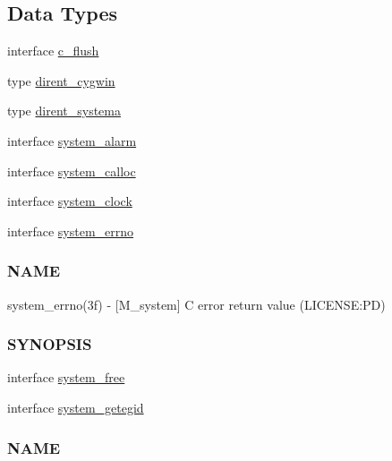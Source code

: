 \subsection*{Data Types}
\begin{DoxyCompactItemize}
\item 
interface \mbox{\hyperlink{interfacem__system_1_1c__flush}{c\+\_\+flush}}
\item 
type \mbox{\hyperlink{structm__system_1_1dirent__cygwin}{dirent\+\_\+cygwin}}
\item 
type \mbox{\hyperlink{structm__system_1_1dirent__systema}{dirent\+\_\+systema}}
\item 
interface \mbox{\hyperlink{interfacem__system_1_1system__alarm}{system\+\_\+alarm}}
\item 
interface \mbox{\hyperlink{interfacem__system_1_1system__calloc}{system\+\_\+calloc}}
\item 
interface \mbox{\hyperlink{interfacem__system_1_1system__clock}{system\+\_\+clock}}
\item 
interface \mbox{\hyperlink{interfacem__system_1_1system__errno}{system\+\_\+errno}}
\begin{DoxyCompactList}\small\item\em \subsubsection*{N\+A\+ME}

system\+\_\+errno(3f) -\/ \mbox{[}M\+\_\+system\mbox{]} C error return value (L\+I\+C\+E\+N\+SE\+:PD) \subsubsection*{S\+Y\+N\+O\+P\+S\+IS}\end{DoxyCompactList}\item 
interface \mbox{\hyperlink{interfacem__system_1_1system__free}{system\+\_\+free}}
\item 
interface \mbox{\hyperlink{interfacem__system_1_1system__getegid}{system\+\_\+getegid}}
\begin{DoxyCompactList}\small\item\em \subsubsection*{N\+A\+ME}


\end{DoxyCompactList}
\end{DoxyCompactItemize}
